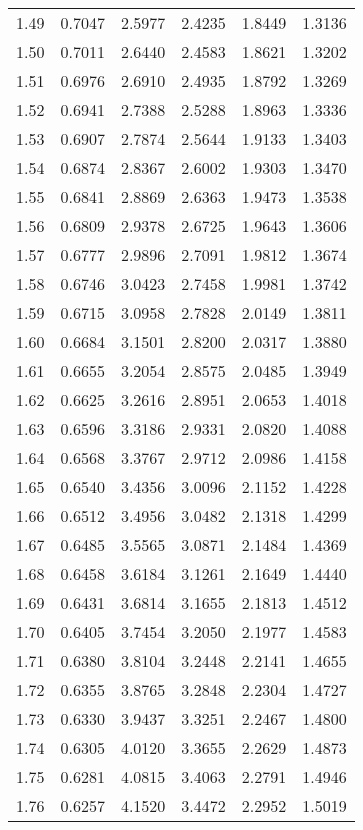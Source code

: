\documentclass{article}
\begin{document}
\begin{longtable}{cccccc}
1.49 & 0.7047 & 2.5977 & 2.4235 & 1.8449 & 1.3136 \\
1.50 & 0.7011 & 2.6440 & 2.4583 & 1.8621 & 1.3202 \\
1.51 & 0.6976 & 2.6910 & 2.4935 & 1.8792 & 1.3269 \\
1.52 & 0.6941 & 2.7388 & 2.5288 & 1.8963 & 1.3336 \\
1.53 & 0.6907 & 2.7874 & 2.5644 & 1.9133 & 1.3403 \\
1.54 & 0.6874 & 2.8367 & 2.6002 & 1.9303 & 1.3470 \\
1.55 & 0.6841 & 2.8869 & 2.6363 & 1.9473 & 1.3538 \\
1.56 & 0.6809 & 2.9378 & 2.6725 & 1.9643 & 1.3606 \\
1.57 & 0.6777 & 2.9896 & 2.7091 & 1.9812 & 1.3674 \\
1.58 & 0.6746 & 3.0423 & 2.7458 & 1.9981 & 1.3742 \\
1.59 & 0.6715 & 3.0958 & 2.7828 & 2.0149 & 1.3811 \\
1.60 & 0.6684 & 3.1501 & 2.8200 & 2.0317 & 1.3880 \\
1.61 & 0.6655 & 3.2054 & 2.8575 & 2.0485 & 1.3949 \\
1.62 & 0.6625 & 3.2616 & 2.8951 & 2.0653 & 1.4018 \\
1.63 & 0.6596 & 3.3186 & 2.9331 & 2.0820 & 1.4088 \\
1.64 & 0.6568 & 3.3767 & 2.9712 & 2.0986 & 1.4158 \\
1.65 & 0.6540 & 3.4356 & 3.0096 & 2.1152 & 1.4228 \\
1.66 & 0.6512 & 3.4956 & 3.0482 & 2.1318 & 1.4299 \\
1.67 & 0.6485 & 3.5565 & 3.0871 & 2.1484 & 1.4369 \\
1.68 & 0.6458 & 3.6184 & 3.1261 & 2.1649 & 1.4440 \\
1.69 & 0.6431 & 3.6814 & 3.1655 & 2.1813 & 1.4512 \\
1.70 & 0.6405 & 3.7454 & 3.2050 & 2.1977 & 1.4583 \\
1.71 & 0.6380 & 3.8104 & 3.2448 & 2.2141 & 1.4655 \\
1.72 & 0.6355 & 3.8765 & 3.2848 & 2.2304 & 1.4727 \\
1.73 & 0.6330 & 3.9437 & 3.3251 & 2.2467 & 1.4800 \\
1.74 & 0.6305 & 4.0120 & 3.3655 & 2.2629 & 1.4873 \\
1.75 & 0.6281 & 4.0815 & 3.4063 & 2.2791 & 1.4946 \\
1.76 & 0.6257 & 4.1520 & 3.4472 & 2.2952 & 1.5019 \\

\end{longtable}
\end{document}
